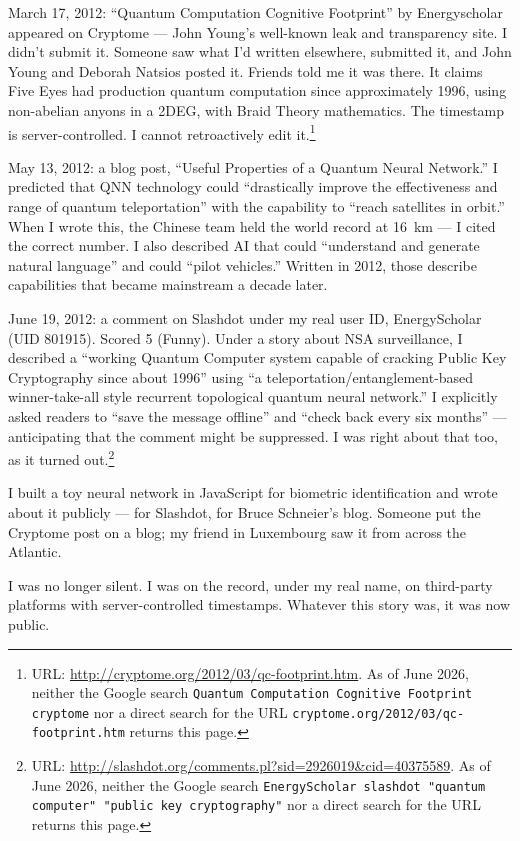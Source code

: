 March 17, 2012: ``Quantum Computation Cognitive Footprint'' by Energyscholar appeared on Cryptome --- John Young's well-known leak and transparency site. I didn't submit it. Someone saw what I'd written elsewhere, submitted it, and John Young and Deborah Natsios posted it. Friends told me it was there. It claims Five Eyes had production quantum computation since approximately 1996, using non-abelian anyons in a 2DEG, with Braid Theory mathematics. The timestamp is server-controlled. I cannot retroactively edit it.\footnote{URL: \url{http://cryptome.org/2012/03/qc-footprint.htm}. As of June 2026, neither the Google search \texttt{Quantum Computation Cognitive Footprint cryptome} nor a direct search for the URL \texttt{cryptome.org/2012/03/qc-footprint.htm} returns this page.}

May 13, 2012: a blog post, ``Useful Properties of a Quantum Neural Network.'' I predicted that QNN technology could ``drastically improve the effectiveness and range of quantum teleportation'' with the capability to ``reach satellites in orbit.'' When I wrote this, the Chinese team held the world record at 16~km --- I cited the correct number. I also described AI that could ``understand and generate natural language'' and could ``pilot vehicles.'' Written in 2012, those describe capabilities that became mainstream a decade later.

June 19, 2012: a comment on Slashdot under my real user ID, EnergyScholar (UID 801915). Scored 5 (Funny). Under a story about NSA surveillance, I described a ``working Quantum Computer system capable of cracking Public Key Cryptography since about 1996'' using ``a teleportation/entanglement-based winner-take-all style recurrent topological quantum neural network.'' I explicitly asked readers to ``save the message offline'' and ``check back every six months'' --- anticipating that the comment might be suppressed. I was right about that too, as it turned out.\footnote{URL: \url{http://slashdot.org/comments.pl?sid=2926019&cid=40375589}. As of June 2026, neither the Google search \texttt{EnergyScholar slashdot "quantum computer" "public key cryptography"} nor a direct search for the URL returns this page.}

I built a toy neural network in JavaScript for biometric identification and wrote about it publicly --- for Slashdot, for Bruce Schneier's blog. Someone put the Cryptome post on a blog; my friend in Luxembourg saw it from across the Atlantic.

I was no longer silent. I was on the record, under my real name, on third-party platforms with server-controlled timestamps. Whatever this story was, it was now public.

